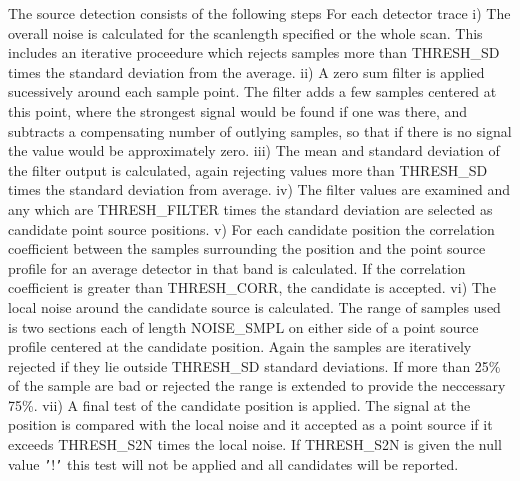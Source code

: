 \begin{small}
{{      The source detection consists of the following steps
      For each detector trace
      i)   The overall noise is calculated for the scanlength specified
           or the whole scan. This includes an iterative proceedure
           which rejects samples more than THRESH\_SD times the standard
           deviation from the average.
      ii)  A zero sum filter is applied sucessively around each sample
           point. The filter adds a few samples centered at this point, where
           the strongest signal would be found if one was there, and subtracts
           a compensating number of outlying samples, so that if there is
           no signal the value would be approximately zero.
      iii) The mean and standard deviation of the filter output is calculated,
           again rejecting values more than THRESH\_SD times the standard
           deviation from average.
      iv)  The filter values are examined and any which are THRESH\_FILTER
           times the standard deviation are selected as candidate point
           source positions.
      v)   For each candidate position the correlation coefficient between
           the samples surrounding the position and the point source profile
           for an average detector in that band is calculated. If the
           correlation coefficient is greater than THRESH\_CORR, the candidate
           is accepted.
      vi)  The local noise around the candidate source is calculated. The
           range of samples used is two sections each of length NOISE\_SMPL
           on either side of a point source profile centered at the
           candidate position. Again the samples are iteratively rejected if
           they lie outside THRESH\_SD standard deviations. If more than 25\%
           of the sample are bad or rejected the range is extended to provide
           the neccessary 75\%.
      vii) A final test of the candidate position is applied. The signal at
           the position is compared with the local noise and it accepted as
           a point source if it exceeds THRESH\_S2N times the local noise.
           If THRESH\_S2N is given the null value {\tt '}!{\tt '} this test will not be
           applied and all candidates will be reported.

}}
\end{small}
